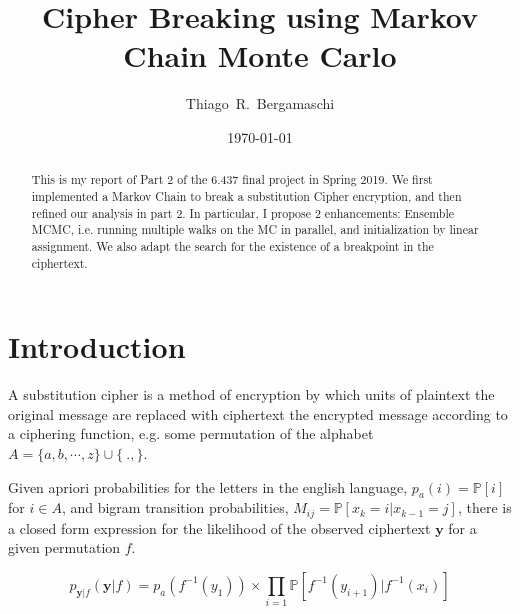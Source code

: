 \documentclass[aps,prd,final,twocolumn,letterpaper]{revtex4}
\begin{document}

\title{Cipher Breaking using Markov Chain Monte Carlo}
\author{Thiago~R.~Bergamaschi}
\date{\today} 

\begin{abstract}
\noindent	
This is my report of Part 2 of the 6.437 final project in Spring 2019. We first implemented a Markov Chain to break a substitution Cipher encryption, and then refined our analysis in part 2. In particular, I propose 2 enhancements: Ensemble MCMC, i.e. running multiple walks on the MC in parallel, and initialization by linear assignment. We also adapt the search for the existence of a breakpoint in the ciphertext.
\end{abstract}

\maketitle
\pagestyle{myheadings}
\thispagestyle{empty}


\section{Introduction}
A substitution cipher is a method of encryption by which units of plaintext the original message are replaced with ciphertext the encrypted message according to a ciphering function, e.g. some permutation of the alphabet $A = \{a, b, \cdots, z\}\cup \{\ ., \}$. 

Given apriori probabilities for the letters in the english language, $p_a(i)=\mathbb{P}[i]$ for $i\in A$, and bigram transition probabilities, $M_{ij}=\mathbb{P}[x_{k} = i|x_{k-1} = j]$, there is a closed form expression for the likelihood of the observed ciphertext $\mathbf{y}$ for a given permutation $f$.

\begin{equation}
p_{\mathbf{y}|f}(\mathbf{y}|f) =  p_a(f^{-1}(y_1))\times \prod_{i=1} \mathbb{P}[f^{-1}(y_{i+1}) |f^{-1}(x_{i})]
\end{equation}
\end{document}
